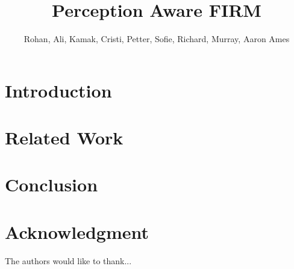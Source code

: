 \documentclass[conference]{IEEEtran}
\begin{document}

\title{\huge Perception Aware FIRM}

\author{Rohan, Ali, Kamak, Cristi, Petter, Sofie, Richard, Murray, Aaron Ames}

\maketitle

\begin{abstract}

\end{abstract}



\section{Introduction}


\section{Related Work}


\section{Conclusion}


\section*{Acknowledgment}
The authors would like to thank...
\end{document}
